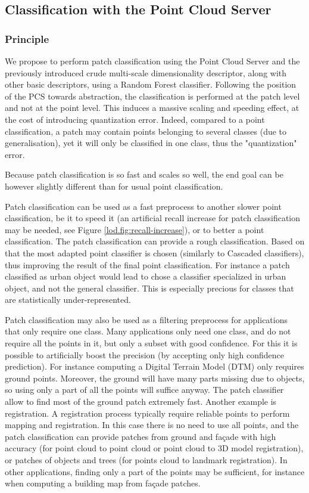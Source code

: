 		
	\subsection{Classification with the Point Cloud Server}
		\label{lod.method.classif}
		\subsubsection{Principle}
		
		We propose to perform patch classification using the Point Cloud Server and the previously introduced crude multi-scale dimensionality descriptor, along with other basic descriptors, using a Random Forest classifier.
		Following the position of the PCS towards abstraction, the classification is performed at the patch level and not at the point level. 
		This induces a massive scaling and speeding effect, at the cost of introducing quantization error.
		Indeed, compared to a point classification, a patch may contain points belonging to several classes (due to generalisation), yet it will only be classified in one class, thus the "quantization" error.
		
		Because patch classification is so fast and scales so well,
		the end goal can be however slightly different than for usual point classification.
		
		
		Patch classification can be used as a fast preprocess to another slower point classification,
		be it to speed it (an artificial recall increase for patch classification may be needed, see Figure \ref{lod.fig:recall-increase}), or to better a point classification.
		The patch classification can provide a rough classification.
		Based on that the most adapted point classifier is chosen 
		(similarly to Cascaded classifiers),
		thus improving the result of the final point classification.
		For instance a patch classified as urban object would lead to chose a classifier specialized in urban object, and not the general classifier.
		This is especially precious for classes that are statistically under-represented.
		 
		Patch classification may also be used as a filtering preprocess for applications that only require one class. 
		Many applications only need one class, and do not require all the points in it, but only a subset with good confidence.
		For this it is possible to artificially boost the precision (by accepting only high confidence prediction).
		For instance computing a Digital Terrain Model (DTM) only requires ground points.
		Moreover, the ground will have many parts missing due to objects,
		so using only a part of all the points will suffice anyway. 
		The patch classifier allow to find most of the ground patch extremely fast.
		Another example is registration.
		A registration process typically require reliable points to perform mapping and registration.
		In this case there is no need to use all points,
		and the patch classification can provide patches from ground and façade with high accuracy
		(for point cloud to point cloud or point cloud to 3D model registration),
		or patches of objects and trees (for points cloud to landmark registration).
		In other applications, finding only a part of the points may be sufficient, for instance when computing a building map from façade patches.
		
